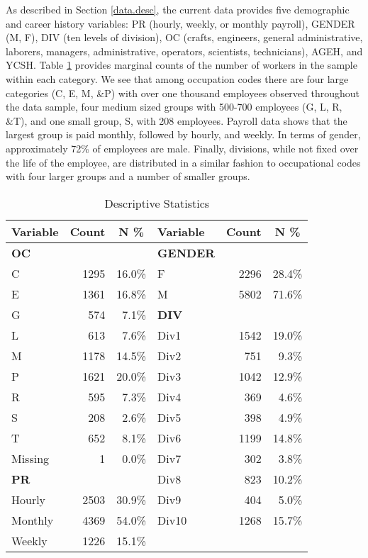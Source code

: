 \documentclass[12pt,letterpaper]{article}
\begin{document}
As described in Section \ref{data.desc}, the current data provides five demographic and career history variables: PR (hourly, weekly, or monthly payroll), GENDER (M, F), DIV (ten levels of division), OC (crafts, engineers, general administrative, laborers, managers, administrative, operators, scientists, technicians), AGEH, and YCSH. Table \ref{tab:descriptive} provides marginal counts of the number of workers in the sample within each category.  We see that among occupation codes there are four large categories (C, E, M, \&P)  with over one thousand employees observed throughout the data sample, four medium sized groups with 500-700 employees (G, L, R, \&T), and one small group, S, with 208 employees.  Payroll data shows that the largest group is paid monthly, followed by hourly, and weekly.  In terms of gender, approximately 72\% of employees are male. Finally, divisions, while not fixed over the life of the employee, are distributed in a similar fashion to occupational codes with four larger groups and a number of smaller groups.
\begin{table}[htbp]
	\centering
	\scriptsize
	\renewcommand{\arraystretch}{1.5}
	\caption{Descriptive Statistics}
	\begin{tabular}{lrrlrr}
		\toprule
		\textbf{Variable}	& \multicolumn{1}{c}{\textbf{Count}} & \multicolumn{1}{c}{\textbf{N \%}}  &   \textbf{Variable}    & \multicolumn{1}{c}{\textbf{Count}} & \multicolumn{1}{c}{\textbf{N \%}} \\
		\midrule
		\textbf{OC} &       &       & \textbf{GENDER} &       &  \\
		C     & 1295  & 16.0\% & F     & 2296  & 28.4\% \\
		E     & 1361  & 16.8\% & M     & 5802  & 71.6\% \\
		G     & 574   & 7.1\% & \textbf{DIV} &       &  \\
		L     & 613   & 7.6\% & Div1 & 1542  & 19.0\% \\
		M     & 1178  & 14.5\% & Div2 & 751   & 9.3\% \\
		P     & 1621  & 20.0\% & Div3 & 1042  & 12.9\% \\
		R     & 595   & 7.3\% & Div4 & 369   & 4.6\% \\
		S     & 208   & 2.6\% & Div5 & 398   & 4.9\% \\
		T     & 652   & 8.1\% & Div6 & 1199  & 14.8\% \\
		Missing & 1     & 0.0\% & Div7 & 302   & 3.8\% \\
		\textbf{PR} &  &   & Div8 & 823   & 10.2\% \\
		Hourly & 2503  & 30.9\% & Div9 & 404   & 5.0\% \\
		Monthly & 4369  & 54.0\% & Div10 & 1268  & 15.7\% \\
		Weekly & 1226  & 15.1\% &       &       &  \\
		\bottomrule
	\end{tabular}%
	\label{tab:descriptive}%
\end{table}%
\end{document}

